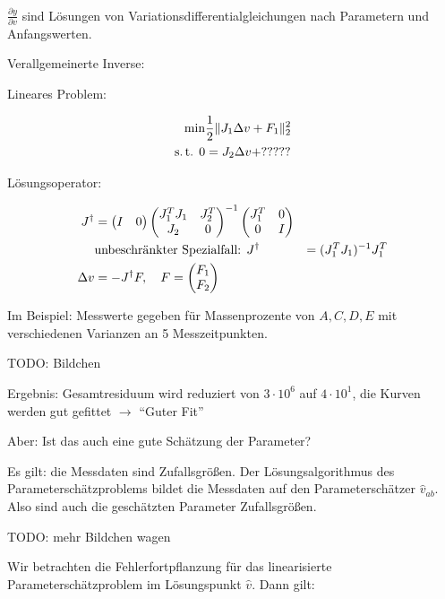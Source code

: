 \begin{align*}
\end{align*}

$\frac{\partial y}{\partial v}$ sind Lösungen von Variationsdifferentialgleichungen nach Parametern und Anfangswerten.

Verallgemeinerte Inverse:

Lineares Problem:

\begin{align*}
\min &\frac 12 \|J_1 \Delta v + F_1\|_2^2 \\
\text{s.\,t. } 0 &= J_2 \Delta v + ?????
\end{align*}

Lösungsoperator:

\begin{align*}
J^\dagger &= \begin{pmatrix} I & 0 \end{pmatrix} \begin{pmatrix} J_1^T J_1 & J_2^T \\ J_2 & 0 \end{pmatrix}^{-1} \begin{pmatrix} J_1^T & 0 \\ 0 & I \end{pmatrix} \\
&\text{unbeschränkter Spezialfall: } J^\dagger &= (J_1^T J_1)^{-1} J_1^T \\
\Delta v &= -J^\dagger F, \quad F = \begin{pmatrix} F_1 \\ F_2 \end{pmatrix}
\end{align*}

Im Beispiel: Messwerte gegeben für Massenprozente von $A,C,D,E$ mit verschiedenen Varianzen an 5 Messzeitpunkten.

TODO: Bildchen

Ergebnis: Gesamtresiduum wird reduziert von $3\cdot 10^6$ auf $4\cdot 10^1$, die Kurven werden gut gefittet $\to$ "`Guter Fit"'

Aber: Ist das auch eine gute Schätzung der Parameter?

Es gilt: die Messdaten sind Zufallsgrößen. Der Lösungsalgorithmus des Parameterschätzproblems bildet die Messdaten auf den Parameterschätzer $\hat v_{ab}$. Also sind auch die geschätzten Parameter Zufallsgrößen.

TODO: mehr Bildchen wagen

Wir betrachten die Fehlerfortpflanzung für das linearisierte Parameterschätzproblem im Lösungspunkt $\hat v$. Dann gilt:

